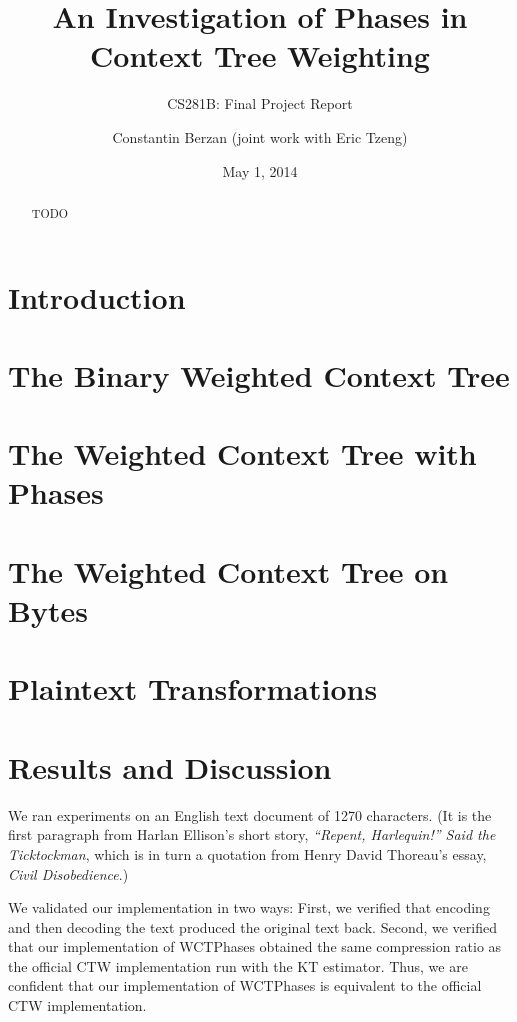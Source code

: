 \documentclass[11pt]{scrartcl}
\title{An Investigation of Phases in Context Tree Weighting}
\subtitle{CS281B: Final Project Report}
\author{Constantin Berzan (joint work with Eric Tzeng)}
\date{May 1, 2014}
\begin{document}
\maketitle

\begin{abstract}
TODO
\end{abstract}

\section{Introduction}


\section{The Binary Weighted Context Tree}


\section{The Weighted Context Tree with Phases}


\section{The Weighted Context Tree on Bytes}


\section{Plaintext Transformations}


\section{Results and Discussion}

We ran experiments on an English text document of 1270 characters. (It is the
first paragraph from Harlan Ellison's short story, {\em ``Repent, Harlequin!''
Said the Ticktockman}, which is in turn a quotation from Henry David Thoreau's
essay, {\em Civil Disobedience}.)

We validated our implementation in two ways: First, we verified that encoding
and then decoding the text produced the original text back. Second, we verified
that our implementation of WCTPhases obtained the same compression ratio as the
official CTW implementation run with the KT estimator. Thus, we are confident
that our implementation of WCTPhases is equivalent to the official CTW
implementation.
\end{document}
